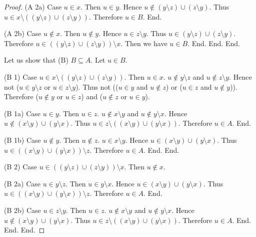 \documentclass[../../set-theory.ftl.tex]{subfiles}
\begin{document}
\begin{forthel}
\begin{proof}
          (A 2a) Case $u \in x$.
            Then $u \in y$.
            Hence $u \notin (y \setminus z) \cup (z \setminus y)$.
            Thus $u \in x \setminus ((y \setminus z) \cup (z \setminus y))$.
            Therefore $u \in B$.
          End.

          (A 2b) Case $u \notin x$.
            Then $u \notin y$.
            Hence $u \in z \setminus y$.
            Thus $u \in (y \setminus z) \cup (z \setminus y)$.
            Therefore $u \in ((y \setminus z) \cup (z \setminus y)) \setminus x$.
            Then we have $u \in B$.
          End.
        End.
      End.

      Let us show that (B) $B \subseteq A$.
        Let $u \in B$.

        (B 1) Case $u \in x \setminus ((y \setminus z) \cup (z \setminus y))$.
          Then $u \in x$.
          $u \notin y \setminus z$ and $u \notin z \setminus y$.
          Hence not ($u \in y \setminus z$ or $u \in z \setminus y$).
          Thus not (($u \in y$ and $u \notin z$) or ($u \in z$ and
          $u \notin y$)).
          Therefore ($u \notin y$ or $u \in z$) and ($u \notin z$ or $u \in y$).

          (B 1a) Case $u \in y$.
            Then $u \in z$.
            $u \notin x \setminus y$ and $u \notin y \setminus x$.
            Hence $u \notin (x \setminus y) \cup (y \setminus x)$.
            Thus $u \in z \setminus ((x \setminus y) \cup (y \setminus x))$.
            Therefore $u \in A$.
          End.

          (B 1b) Case $u \notin y$.
            Then $u \notin z$.
            $u \in x \setminus y$.
            Hence $u \in (x \setminus y) \cup (y \setminus x)$.
            Thus $u \in ((x \setminus y) \cup (y \setminus x)) \setminus z$.
            Therefore $u \in A$.
          End.
        End.

        (B 2) Case $u \in ((y \setminus z) \cup (z \setminus y)) \setminus x$.
          Then $u \notin x$.

          (B 2a) Case $u \in y \setminus z$.
            Then $u \in y \setminus x$.
            Hence $u \in (x \setminus y) \cup (y \setminus x)$.
            Thus $u \in ((x \setminus y) \cup (y \setminus x)) \setminus z$.
            Therefore $u \in A$.
          End.

          (B 2b) Case $u \in z \setminus y$.
            Then $u \in z$.
            $u \notin x \setminus y$ and $u \notin y \setminus x$.
            Hence $u \notin (x \setminus y) \cup (y \setminus x)$.
            Thus $u \in z \setminus ((x \setminus y) \cup (y \setminus x))$.
            Therefore $u \in A$.
          End.
        End.
      End.
    \end{proof}



\end{forthel}
\end{document}
